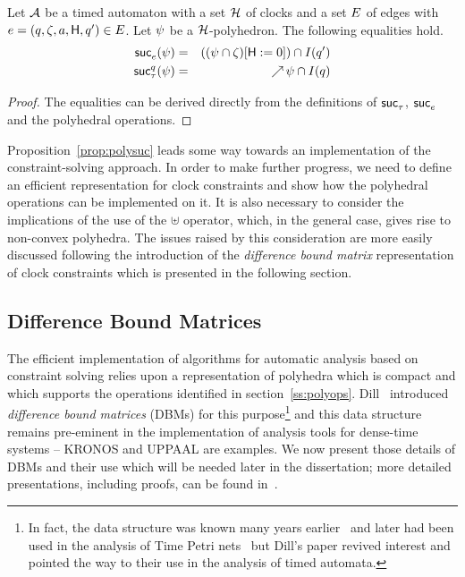 {\begin{proposition}\label{prop:polysuc}
Let $\AA$ be a timed automaton with a set $\clocks$ of clocks and
a set $E$ of edges with $e = (q,{\zeta},a,{\sf H},q') \in E$. Let ${\psi}$ be a $\clocks$-polyhedron.
The following equalities hold. 
\begin{eqnarray*}
  \mathop{{\sf suc}_{e}^{}}({\psi}) & = & (({\psi} \cap {\zeta})[{\sf H}:=0]) \cap I(q') \\ 
  \mathop{{\sf suc}_{\tau}^{q}}({\psi}) & = & \mathop{\nearrow}{{\psi}} \cap I(q)\end{eqnarray*}
\end{proposition}
\begin{proof}
The equalities can be derived directly from the definitions of
$\mathop{{\sf suc}_{\tau}^{}}$, $\mathop{{\sf suc}_{e}^{}}$ and the polyhedral operations.
\end{proof}

Proposition~\ref{prop:polysuc} leads some way towards an
implementation of the constraint-solving approach.  In order to make
further progress, we need to define an efficient representation for
clock constraints and show how the polyhedral operations can be
implemented on it. It is also necessary to consider the implications
of the use of the $\uplus$ operator, which, in the general case, gives
rise to non-convex polyhedra. The issues raised by this consideration
are more easily discussed following the introduction of the
\emph{difference bound matrix} representation of clock constraints
which is presented in the following section.

\subsection{Difference Bound Matrices} \label{ss:mscdbm}
The efficient implementation of algorithms for automatic analysis
based on constraint solving relies upon a representation of polyhedra
which is compact and which supports the operations identified in
section~\ref{ss:polyops}. Dill~\cite{dil:89} introduced
\emph{difference bound matrices} (DBMs) for this purpose\footnote{In
fact, the data structure was known many years earlier~\cite{bel:57}
and later had been used in the analysis of Time Petri
nets~\cite{mb:83} but Dill's paper revived interest and pointed the
way to their use in the analysis of timed automata.} and this data
structure remains pre-eminent in the implementation of analysis tools
for dense-time systems -- KRONOS and UPPAAL are examples. We now
present those details of DBMs and their use which will be needed later
in the dissertation; more detailed presentations, including
proofs, can be found in~\cite{dil:89,oli:94,tri:98,yov:93,yov:97}.

}
